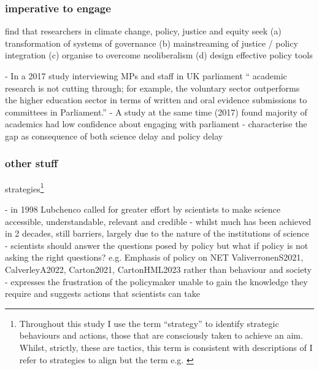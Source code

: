 \subsubsection{imperative to engage}


\cite{CairneyTS2023} find that researchers in climate change, policy, justice and equity seek (a) transformation of systems of governance (b) mainstreaming of justice / policy integration (c) organise to overcome neoliberalism (d) design effective policy tools

\cite{KennyRHTB2017} - In a 2017 study interviewing MPs and staff in UK parliament `` academic research is not cutting through; for example, the voluntary sector outperforms the higher education sector in terms of written and oral evidence submissions to committees in Parliament.''
\cite{KEU2021perceptions} - A study at the same time (2017) found majority of academics had low confidence about engaging with parliament
\cite{KarlssonG2020} - characterise the gap as consequence of both science delay and policy delay



\subsubsection{other stuff}
strategies\footnote{Throughout this study I use the term ``strategy'' to identify strategic behaviours and actions, those that are consciously taken to achieve an aim. Whilst, strictly, these are tactics, this term is consistent with descriptions of  I refer to strategies to align but the term  e.g. \cite{WeimerV2015}}

\cite{LubchencoR2020} - in 1998 Lubchenco called for greater effort by scientists to make science accessible, understandable, relevant and credible - whilst much has been achieved in 2 decades, still barriers, largely due to the nature of the institutions of science
\cite{Gerber2023} - scientists should answer the questions posed by policy but what if policy is not asking the right questions? e.g. Emphasis of policy on NET ValiverronenS2021, CalverleyA2022, Carton2021, CartonHML2023 rather than behaviour and society
\cite{Bisbal2024} - expresses the frustration of the policymaker unable to gain the knowledge they require and suggests actions that scientists can take 


